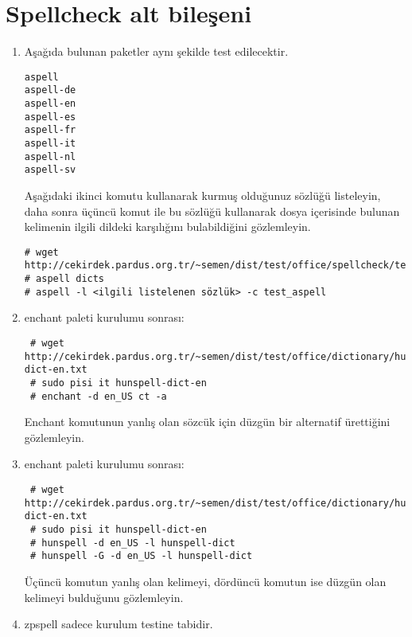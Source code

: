 \documentclass[a4paper,10pt]{article}
\begin{document}
\section{ Spellcheck alt bileşeni}
\begin{enumerate}
\item Aşağıda bulunan paketler aynı şekilde test edilecektir.
\begin{verbatim}
aspell
aspell-de
aspell-en
aspell-es
aspell-fr
aspell-it
aspell-nl
aspell-sv 
\end{verbatim}

Aşağıdaki ikinci komutu kullanarak kurmuş olduğunuz sözlüğü listeleyin, daha sonra üçüncü komut ile bu sözlüğü kullanarak dosya içerisinde bulunan kelimenin ilgili dildeki karşılığını bulabildiğini gözlemleyin.
\begin{verbatim}
# wget http://cekirdek.pardus.org.tr/~semen/dist/test/office/spellcheck/test_aspell
# aspell dicts
# aspell -l <ilgili listelenen sözlük> -c test_aspell
\end{verbatim}
\item enchant paleti kurulumu sonrası:
\begin{verbatim}
 # wget http://cekirdek.pardus.org.tr/~semen/dist/test/office/dictionary/hunspell-dict-en.txt
 # sudo pisi it hunspell-dict-en
 # enchant -d en_US ct -a
\end{verbatim}
Enchant komutunun yanlış olan sözcük için düzgün bir alternatif ürettiğini gözlemleyin.

\item enchant paleti kurulumu sonrası:
\begin{verbatim}
 # wget http://cekirdek.pardus.org.tr/~semen/dist/test/office/dictionary/hunspell-dict-en.txt
 # sudo pisi it hunspell-dict-en
 # hunspell -d en_US -l hunspell-dict
 # hunspell -G -d en_US -l hunspell-dict
\end{verbatim}
Üçüncü komutun yanlış olan kelimeyi, dördüncü komutun ise düzgün olan kelimeyi bulduğunu gözlemleyin.

\item zpspell sadece kurulum testine tabidir.
\end{enumerate}
\end{document}
